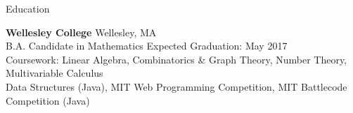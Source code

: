 \documentclass{resume} %
\begin{document}

\begin{rSection}{Education}

{\bf Wellesley College} {} \hfill {Wellesley, MA}\\ 
B.A. Candidate in Mathematics \hfill {Expected Graduation: May 2017} \smallskip \\
Coursework: Linear Algebra, Combinatorics \& Graph Theory, Number Theory, Multivariable Calculus \\ 
Data Structures (Java), MIT Web Programming Competition, MIT Battlecode Competition (Java) \smallskip\\%

\end{rSection}

\end{document}
